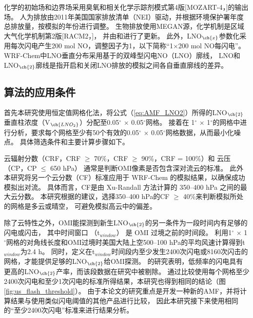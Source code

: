 化学的初始场和边界场采用臭氧和相关化学示踪剂模式第4版[MOZART-4，\citet{Emmons.2010}]的输出场。
人为排放由2011年美国国家排放清单（NEI）驱动，并根据环境保护署年度总排放量，按模拟的年份进行调整\citep{EPA.2015}。
生物排放使用MEGAN源，化学机制是区域大气化学机制第2版[RACM2，\citet{Goliff.2013}]，
并由\citet{Browne.2014}和\citet{Schwantes.2015}进行了更新。
此外，LNO$_{\ch{x}}$参数化采用每次闪电产生200 mol NO，调整因子为1，以下简称“1$\times$200 mol NO每闪电”。
WRF-Chem中LNO垂直分布采用基于\citet{Ott.2010}的双峰型闪电NO（LNO）廓线\citep{Laughner.2017}，
LNO和LNO$_{\ch{2}}$廓线是指开启和关闭LNO排放的模拟之间各自垂直廓线的差异。


\subsection{算法的应用条件}

首先本研究使用恒定值网格化法，将公式（\ref{eq:AMF_LNO2}）所得的LNO$_{\ch{2}}$垂直柱浓度（V$_{\ch{LNO_2}}$）分配至0.05$^{\circ}$ $\times$ 0.05$^{\circ}$网格\citep{Kuhlmann.2014}。
接着在 1$^{\circ}$ $\times$ 1$^{\circ}$的网格中进行分析，要求每个网格至少有50个有效的0.05$^{\circ}$ $\times$ 0.05$^{\circ}$网格数据，从而最小化噪点。
具体筛选条件和主要计算步骤如下。

云辐射分数（CRF，CRF $\geq$ 70\%，CRF $\geq$ 90\%，CRF = 100\%）和 云压（CP，CP $\leq$ 650 hPa）
通常是判断OMI像素是否包含深对流云的标准\citep{Ziemke.2009,Choi.2014,Pickering.2016}。
此外本研究将另一个云分数（CF）标准应用于 WRF-Chem 的模拟结果，以确保成功模拟出对流。
具体而言，CF是由 Xu-Randall 方法计算的 350--400 hPa 之间的最大云分数\citep{Xu.1996,Strode.2017}。
本研究根据\citet{Strode.2017}的建议，选择350--400 hPa的CF $\geq$ 40\%来判断模拟所处的网格是多云或晴空，
可避免模拟高云中的偏差。

除了云特性之外，OMI能探测到新生LNO$_{\ch{2}}$的另一条件为一段时间内有足够的闪电或闪击，
其中时间窗口 （t$_{window}$） 是 OMI 过境之前的时间段。
\citet{Lapierre.2020}利用1$^{\circ}$ $\times$ 1$^{\circ}$网格的对角线长度和OMI过境时美国大陆上空500--100 hPa的平均风速计算得到t$_{window}$为2.4 h。
同时，\citet{Lapierre.2020}定义在t$_{window}$时间段内至少发生2400次闪电或8160次闪击的网格，才能提供足够的LNO$_{\ch{2}}$给OMI探测。
\citet{Bucsela.2019}的研究表明，低频率的闪电具有更高的LNO$_{\ch{2}}$产率，而该段数据在\citet{Lapierre.2020}研究中被剔除。
通过比较使用每个网格至少2400次闪电和至少1次闪电的标准所得结果，本研究也得到相同的结论（图\ref{fig:us_flash_threshold}）。
由于本论文的研究重点是开发一种新的AMF，并将计算结果与使用类似闪电阈值的其他产品进行比较\citep{Pickering.2016,Lapierre.2020}，
因此本研究接下来使用相同的“至少2400次闪电”标准来进行结果分析。


